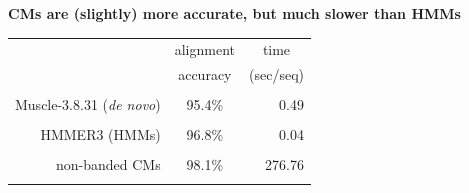 \documentclass[landscape]{slides}
\begin{document}
\begin{slide}
\begin{center}

\textbf{CMs are (slightly) more accurate, but much slower than HMMs}
\end{center}
\medskip
\medskip
\begin{center}

\begin{tabular}{rcr} 
& \multicolumn{1}{c}{alignment} & \multicolumn{1}{c}{time} \\
& \multicolumn{1}{c}{accuracy} & \multicolumn{1}{c}{(sec/seq)} \\ \hline
& \multicolumn{1}{c}{} & \multicolumn{1}{c}{} \\
Muscle-3.8.31 (\emph{de novo}) & 95.4\% & 0.49 \\
& \multicolumn{1}{c}{} & \multicolumn{1}{c}{} \\
HMMER3 (HMMs) & 96.8\% & 0.04 \\ 
& \multicolumn{1}{c}{} & \multicolumn{1}{c}{} \\
non-banded CMs & 98.1\% & 276.76 \\
& \multicolumn{1}{c}{} & \multicolumn{1}{c}{} \\
\end{tabular}
\end{center}

\vfill
\scriptsize
{}
\end{slide}
\end{document}
